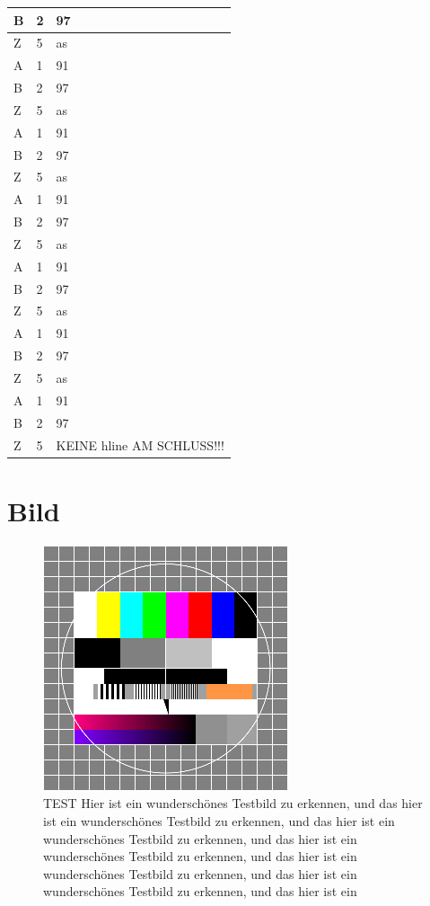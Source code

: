 \documentclass[
12pt, %
toc=listofnumbered, %
toc=chapterentrydotfill, %
numbers=noenddot, %
captions=tableheading, %
bibliography=numbered
]{scrreprt}
\let\Oldsection\section
\renewcommand{\section}{\FloatBarrier\Oldsection}
\begin{document}
\begin{longtable}{|L{3.6cm}|L{6cm}|L{6cm}|}
	B&2&97\\\hline
    Z&5&as\\\hline
	A&1&91\\\hline
	B&2&97\\\hline
	Z&5&as\\\hline
	A&1&91\\\hline
	B&2&97\\\hline
    Z&5&as\\\hline
	A&1&91\\\hline
	B&2&97\\\hline
	Z&5&as\\\hline
	A&1&91\\\hline
	B&2&97\\\hline
	Z&5&as\\\hline
	A&1&91\\\hline
	B&2&97\\\hline
	Z&5&as\\\hline
	A&1&91\\\hline
	B&2&97\\\hline
	Z&5&KEINE hline AM SCHLUSS!!!\\
\end{longtable}

\section{Bild}

\begin{figure}[tph]
	\begin{center}
		\includegraphics[scale = 1]{./images/0_testbild.png}
		\caption{TEST Hier ist ein wunderschönes Testbild zu erkennen, und das hier ist ein wunderschönes Testbild zu erkennen, und das hier ist ein wunderschönes Testbild zu erkennen, und das hier ist ein wunderschönes Testbild zu erkennen, und das hier ist ein wunderschönes Testbild zu erkennen, und das hier ist ein wunderschönes Testbild zu erkennen, und das hier ist ein}
		\label{fig:testbild}
	\end{center}
\end{figure}
\end{document}
